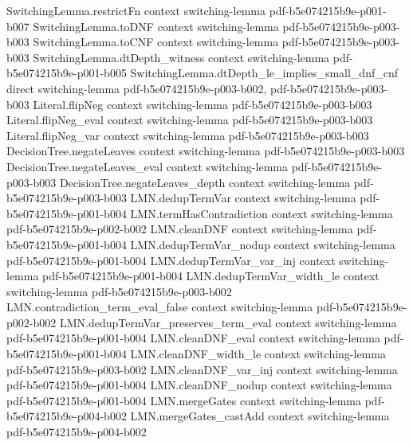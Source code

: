 \begin{lemma}
\proofstep
  {SwitchingLemma.restrictFn}
  {context}
  {switching-lemma}
  {pdf-b5e074215b9e-p001-b007}
\proofstep
  {SwitchingLemma.toDNF}
  {context}
  {switching-lemma}
  {pdf-b5e074215b9e-p003-b003}
\proofstep
  {SwitchingLemma.toCNF}
  {context}
  {switching-lemma}
  {pdf-b5e074215b9e-p003-b003}
\proofstep
  {SwitchingLemma.dtDepth_witness}
  {context}
  {switching-lemma}
  {pdf-b5e074215b9e-p001-b005}
\proofstep
  {SwitchingLemma.dtDepth_le_implies_small_dnf_cnf}
  {direct}
  {switching-lemma}
  {pdf-b5e074215b9e-p003-b002,
    pdf-b5e074215b9e-p003-b003}
\proofstep
  {Literal.flipNeg}
  {context}
  {switching-lemma}
  {pdf-b5e074215b9e-p003-b003}
\proofstep
  {Literal.flipNeg_eval}
  {context}
  {switching-lemma}
  {pdf-b5e074215b9e-p003-b003}
\proofstep
  {Literal.flipNeg_var}
  {context}
  {switching-lemma}
  {pdf-b5e074215b9e-p003-b003}
\proofstep
  {DecisionTree.negateLeaves}
  {context}
  {switching-lemma}
  {pdf-b5e074215b9e-p003-b003}
\proofstep
  {DecisionTree.negateLeaves_eval}
  {context}
  {switching-lemma}
  {pdf-b5e074215b9e-p003-b003}
\proofstep
  {DecisionTree.negateLeaves_depth}
  {context}
  {switching-lemma}
  {pdf-b5e074215b9e-p003-b003}
\proofstep
  {LMN.dedupTermVar}
  {context}
  {switching-lemma}
  {pdf-b5e074215b9e-p001-b004}
\proofstep
  {LMN.termHasContradiction}
  {context}
  {switching-lemma}
  {pdf-b5e074215b9e-p002-b002}
\proofstep
  {LMN.cleanDNF}
  {context}
  {switching-lemma}
  {pdf-b5e074215b9e-p001-b004}
\proofstep
  {LMN.dedupTermVar_nodup}
  {context}
  {switching-lemma}
  {pdf-b5e074215b9e-p001-b004}
\proofstep
  {LMN.dedupTermVar_var_inj}
  {context}
  {switching-lemma}
  {pdf-b5e074215b9e-p001-b004}
\proofstep
  {LMN.dedupTermVar_width_le}
  {context}
  {switching-lemma}
  {pdf-b5e074215b9e-p003-b002}
\proofstep
  {LMN.contradiction_term_eval_false}
  {context}
  {switching-lemma}
  {pdf-b5e074215b9e-p002-b002}
\proofstep
  {LMN.dedupTermVar_preserves_term_eval}
  {context}
  {switching-lemma}
  {pdf-b5e074215b9e-p001-b004}
\proofstep
  {LMN.cleanDNF_eval}
  {context}
  {switching-lemma}
  {pdf-b5e074215b9e-p001-b004}
\proofstep
  {LMN.cleanDNF_width_le}
  {context}
  {switching-lemma}
  {pdf-b5e074215b9e-p003-b002}
\proofstep
  {LMN.cleanDNF_var_inj}
  {context}
  {switching-lemma}
  {pdf-b5e074215b9e-p001-b004}
\proofstep
  {LMN.cleanDNF_nodup}
  {context}
  {switching-lemma}
  {pdf-b5e074215b9e-p001-b004}
\proofstep
  {LMN.mergeGates}
  {context}
  {switching-lemma}
  {pdf-b5e074215b9e-p004-b002}
\proofstep
  {LMN.mergeGates_castAdd}
  {context}
  {switching-lemma}
  {pdf-b5e074215b9e-p004-b002}
\proofstep

\end{lemma}
